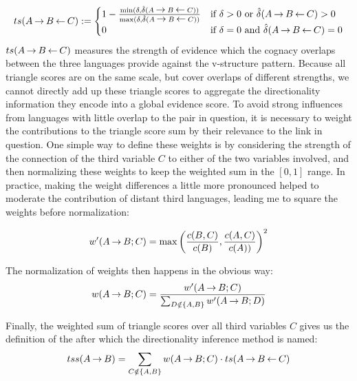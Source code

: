 \begin{equation}
   ts(A \kern 2pt\hbox{$\rightarrow$}\kern 2pt B \kern 2pt\hbox{$\leftarrow$}\kern 2pt C ) :=
   \begin{cases}
     1 - \frac{\min(\delta,\hat{\delta}(A \kern 2pt\hbox{$\rightarrow$}\kern 2pt B \kern 2pt\hbox{$\leftarrow$}\kern 2pt C))}{\max(\delta,\hat{\delta}(A \kern 2pt\hbox{$\rightarrow$}\kern 2pt B \kern 2pt\hbox{$\leftarrow$}\kern 2pt C))} & \text{if } \delta > 0 \text{ or } \hat{\delta}(A \kern 2pt\hbox{$\rightarrow$}\kern 2pt B \kern 2pt\hbox{$\leftarrow$}\kern 2pt C) > 0\\
     0 & \text{if } \delta = 0 \text{ and } \hat{\delta}(A \kern 2pt\hbox{$\rightarrow$}\kern 2pt B \kern 2pt\hbox{$\leftarrow$}\kern 2pt C) = 0
   \end{cases}
\end{equation}
\linebreak
$ts(A \kern 2pt\hbox{$\rightarrow$}\kern 2pt B \kern 2pt\hbox{$\leftarrow$}\kern 2pt C)$ measures the strength of evidence which the cognacy overlaps between the three languages provide against the v-structure pattern. Because all triangle scores are on the same scale, but cover overlaps of different strengths, we cannot directly add up these triangle scores to aggregate the directionality information they encode into a global evidence score. To avoid strong influences from languages with little overlap to the pair in question, it is necessary to weight the contributions to the triangle score sum by their relevance to the link in question. One simple way to define these weights is by considering the strength of the connection of the third variable $C$ to either of the two variables involved, and then normalizing these weights to keep the weighted sum in the $[0,1]$ range. In practice, making the weight differences a little more pronounced helped to moderate the contribution of distant third languages, leading me to square the weights before normalization:

\begin{equation}
 w'(A \kern 2pt\hbox{$\rightarrow$}\kern 2pt B; C) = \max\left(\frac{c(B,C)}{c(B)},\frac{c(A,C)}{c(A))}\right)^2
\end{equation}

The normalization of weights then happens in the obvious way:
\begin{equation}
 w(A \kern 2pt\hbox{$\rightarrow$}\kern 2pt B; C) = \frac{w'(A \kern 2pt\hbox{$\rightarrow$}\kern 2pt B; C)}{\sum_{D \notin\{A,B\}} w'(A \kern 2pt\hbox{$\rightarrow$}\kern 2pt B; D)}
\end{equation}

Finally, the weighted sum of triangle scores over all third variables $C$ gives us the definition of the \textit{} after which the directionality inference method is named: 
\begin{equation}
 tss(A \kern 2pt\hbox{$\rightarrow$}\kern 2pt B) = \sum_{C \notin\{A,B\}} w(A \kern 2pt\hbox{$\rightarrow$}\kern 2pt B; C) \cdot ts(A \kern 2pt\hbox{$\rightarrow$}\kern 2pt B \kern 2pt\hbox{$\leftarrow$}\kern 2pt C)
\end{equation}

